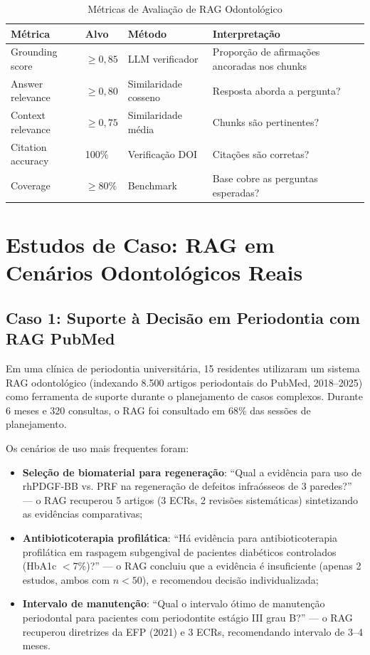 \begin{table}[H]
\centering
\caption{Métricas de Avaliação de RAG Odontológico}
\label{tab:rag-metrics}
\begin{tabular}{p{3cm}p{2cm}p{2.5cm}p{4cm}}
\toprule
\textbf{Métrica} & \textbf{Alvo} & \textbf{Método} & \textbf{Interpretação} \\
\midrule
Grounding score & $\ge 0,85$ & LLM verificador & Proporção de afirmações ancoradas nos chunks \\
Answer relevance & $\ge 0,80$ & Similaridade cosseno & Resposta aborda a pergunta? \\
Context relevance & $\ge 0,75$ & Similaridade média & Chunks são pertinentes? \\
Citation accuracy & 100\% & Verificação DOI & Citações são corretas? \\
Coverage & $\ge 80\%$ & Benchmark & Base cobre as perguntas esperadas? \\
\bottomrule
\end{tabular}
\end{table}

\section{Estudos de Caso: RAG em Cenários Odontológicos Reais}

\subsection{Caso 1: Suporte à Decisão em Periodontia com RAG PubMed}

Em uma clínica de periodontia universitária, 15 residentes utilizaram um sistema RAG odontológico (indexando 8.500 artigos periodontais do PubMed, 2018--2025) como ferramenta de suporte durante o planejamento de casos complexos. Durante 6 meses e 320 consultas, o RAG foi consultado em 68\% das sessões de planejamento.

Os cenários de uso mais frequentes foram:
\begin{itemize}
    \item \textbf{Seleção de biomaterial para regeneração}: ``Qual a evidência para uso de rhPDGF-BB vs. PRF na regeneração de defeitos infraósseos de 3 paredes?'' --- o RAG recuperou 5 artigos (3 ECRs, 2 revisões sistemáticas) sintetizando as evidências comparativas;

    \item \textbf{Antibioticoterapia profilática}: ``Há evidência para antibioticoterapia profilática em raspagem subgengival de pacientes diabéticos controlados (HbA1c $<7\%$)?'' --- o RAG concluiu que a evidência é insuficiente (apenas 2 estudos, ambos com $n < 50$), e recomendou decisão individualizada;

    \item \textbf{Intervalo de manutenção}: ``Qual o intervalo ótimo de manutenção periodontal para pacientes com periodontite estágio III grau B?'' --- o RAG recuperou diretrizes da EFP (2021) e 3 ECRs, recomendando intervalo de 3--4 meses.
\end{itemize}

